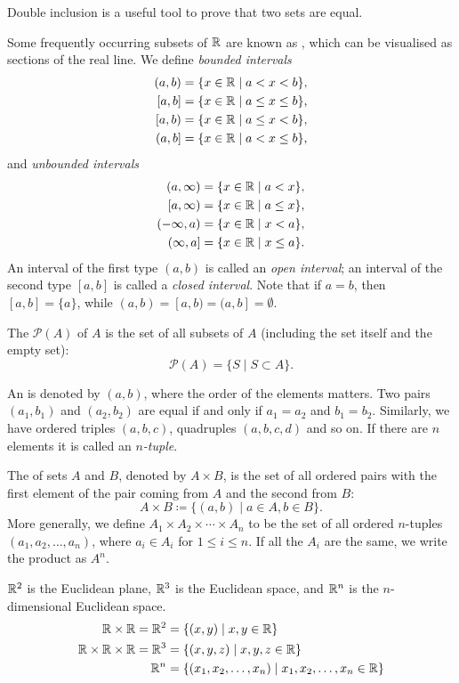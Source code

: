 \begin{remark}
Double inclusion is a useful tool to prove that two sets are equal.
\end{remark}

Some frequently occurring subsets of $\mathbb R$ are known as , which can be visualised as sections of the real line. We define \emph{bounded intervals}
\begin{align*}
(a,b)&=\{x\in\RR\mid a<x<b\},\\
[a,b]&=\{x\in\RR\mid a\le x\le b\},\\
[a,b)&=\{x\in\RR\mid a\le x<b\},\\
(a,b]&=\{x\in\RR\mid a<x\le b\},
\end{align*}
and \emph{unbounded intervals}
\begin{align*}
(a,\infty)&=\{x\in\RR\mid a<x\},\\
[a,\infty)&=\{x\in\RR\mid a\le x\},\\
(-\infty,a)&=\{x\in\RR\mid x<a\},\\
(\infty,a]&=\{x\in\RR\mid x\le a\}.
\end{align*}
An interval of the first type $(a,b)$ is called an \emph{open interval}; an interval of the second type $[a,b]$ is called a \emph{closed interval}. Note that if $a=b$, then $[a,b]=\{a\}$, while $(a,b)=[a,b)=(a,b]=\emptyset$.

The  $\mathcal{P}(A)$ of $A$ is the set of all subsets of $A$ (including the set itself and the empty set):
\[\mathcal{P}(A)=\{S\mid S\subset A\}.\]

An  is denoted by $(a,b)$, where the order of the elements matters. Two pairs $(a_1,b_1)$ and $(a_2,b_2)$ are equal if and only if $a_1=a_2$ and $b_1=b_2$.  Similarly, we have ordered triples $(a,b,c)$, quadruples $(a,b,c,d)$ and so on. If there are $n$ elements it is called an \emph{$n$-tuple}.

The  of sets $A$ and $B$, denoted by $A \times B$, is the set of all ordered pairs with the first element of the pair coming from $A$ and the second from $B$:
\[A\times B\coloneqq\{(a,b)\mid a\in A,b\in B\}.\]
More generally, we define $A_1 \times A_2 \times \cdots \times A_n$ to be the set of all ordered $n$-tuples $(a_1, a_2, \dots, a_n)$, where $a_i \in A_i$ for $1 \le i \le n$. If all the $A_i$ are the same, we write the product as $A^n$.

\begin{example}
$\mathbb R^2$ is the Euclidean plane, $\mathbb R^3$ is the Euclidean space, and $\mathbb R^n$ is the $n$-dimensional Euclidean space.
\begin{align*}
\mathbb R \times \mathbb R = \mathbb R^2 &= \{(x,y) \mid x,y \in \mathbb R\} \\
\mathbb R \times \mathbb R \times \mathbb R = \mathbb R^3 &= \{(x,y,z) \mid x,y,z \in \mathbb R\} \\
\mathbb R^n &= \{(x_1,x_2,\dots,x_n) \mid x_1,x_2,\dots,x_n \in \mathbb R\}
\end{align*}
\end{example}


